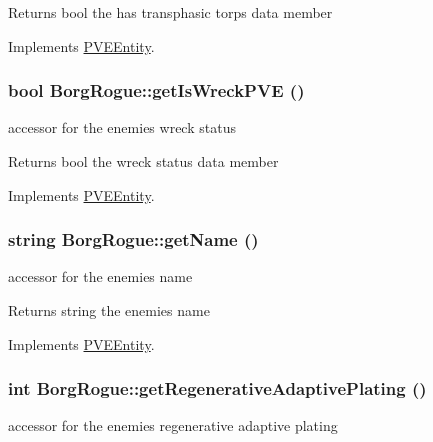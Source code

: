 \begin{DoxyReturn}{Returns}
bool the has transphasic torps data member 
\end{DoxyReturn}


Implements \hyperlink{classPVEEntity}{PVEEntity}.

\hypertarget{classBorgRogue_ac51cbf466e2db63dc9dd895cea4e1977}{
\subsubsection[{getIsWreckPVE}]{\setlength{\rightskip}{0pt plus 5cm}bool BorgRogue::getIsWreckPVE ()}}
\label{db/d4f/classBorgRogue_ac51cbf466e2db63dc9dd895cea4e1977}
accessor for the enemies wreck status

\begin{DoxyReturn}{Returns}
bool the wreck status data member 
\end{DoxyReturn}


Implements \hyperlink{classPVEEntity}{PVEEntity}.

\hypertarget{classBorgRogue_ac4b4cf44886438d6e4cd6933ac46ae0e}{
\subsubsection[{getName}]{\setlength{\rightskip}{0pt plus 5cm}string BorgRogue::getName ()}}
\label{db/d4f/classBorgRogue_ac4b4cf44886438d6e4cd6933ac46ae0e}
accessor for the enemies name

\begin{DoxyReturn}{Returns}
string the enemies name 
\end{DoxyReturn}


Implements \hyperlink{classPVEEntity}{PVEEntity}.

\hypertarget{classBorgRogue_ac5d9f8c62b43fefdc61fe672a8510fa0}{
\subsubsection[{getRegenerativeAdaptivePlating}]{\setlength{\rightskip}{0pt plus 5cm}int BorgRogue::getRegenerativeAdaptivePlating ()}}
\label{db/d4f/classBorgRogue_ac5d9f8c62b43fefdc61fe672a8510fa0}
accessor for the enemies regenerative adaptive plating


